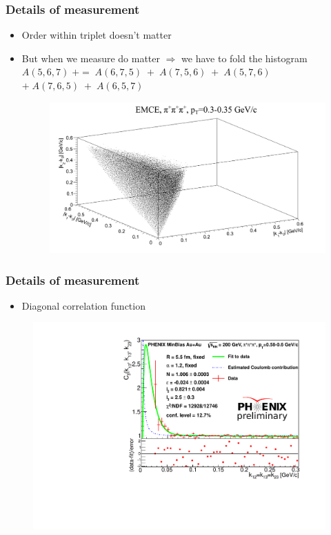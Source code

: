 \documentclass{beamer}
\begin{document}
\begin{frame}
\frametitle{Details of measurement}
\begin{itemize}
\setlength{\itemsep}{16pt}
\item Order within triplet doesn't matter
\item But when we measure do matter $\Rightarrow$ we have to fold the histogram
		$A(5,6,7) \;+=\; A(6,7,5)\; + \;A(7,5,6)\; + \;A(5,7,6)\; $ $+ \;A(7,6,5)\;+\;A(6,5,7)$
\begin{figure}
\includegraphics[scale=0.25]{pic/C2}
\end{figure}
\end{itemize}
\end{frame}

\begin{frame}
\frametitle{Details of measurement}
\begin{itemize}
\setlength{\itemsep}{16pt}
\item Diagonal correlation function
\end{itemize}
\begin{figure}
\includegraphics[scale=0.45]{pic/diag_highpt.pdf}
\end{figure}
\end{frame}
\end{document}
